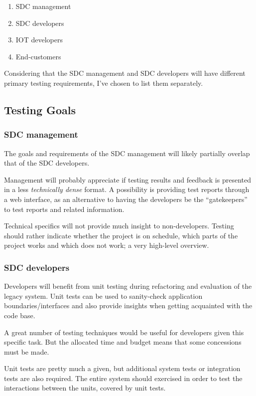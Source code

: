 \begin{enumerate}
    \item SDC management
    \item SDC developers
    \item IOT developers
    \item End-customers
\end{enumerate}

Considering that the SDC management and SDC developers will have different
primary testing requirements, I've chosen to list them separately.


\subsection{Testing Goals}
\subsubsection{SDC management}
The goals and requirements of the SDC management will likely partially overlap
that of the SDC developers.

Management will probably appreciate if testing results and feedback is
presented in a less \emph{technically dense} format. A possibility is providing
test reports through a web interface, as an alternative to having the
developers be the ``gatekeepers'' to test reports and related information.

Technical specifics will not provide much insight to non-developers. Testing
should rather indicate whether the project is on schedule, which parts of the
project works and which does not work; a very high-level overview.


\subsubsection{SDC developers}
Developers will benefit from unit testing during refactoring and evaluation of
the legacy system. Unit tests can be used to sanity-check application
boundaries/interfaces and also provide insights when getting acquainted with
the code base.

A great number of testing techniques would be useful for developers given this
specific task.  But the allocated time and budget means that some concessions
must be made.

Unit tests are pretty much a given, but additional system tests or integration
tests are also required.
The entire system should exercised in order to test the interactions between
the units, covered by unit tests.

